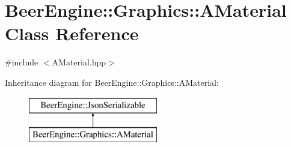 \hypertarget{class_beer_engine_1_1_graphics_1_1_a_material}{}\section{Beer\+Engine\+:\+:Graphics\+:\+:A\+Material Class Reference}
\label{class_beer_engine_1_1_graphics_1_1_a_material}


{\ttfamily \#include $<$A\+Material.\+hpp$>$}

Inheritance diagram for Beer\+Engine\+:\+:Graphics\+:\+:A\+Material\+:\begin{figure}[H]
\begin{center}
\leavevmode
\includegraphics[height=2.000000cm]{class_beer_engine_1_1_graphics_1_1_a_material}
\end{center}
\end{figure}
